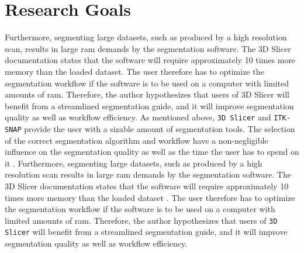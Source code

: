 \section{Research Goals}\label{s:introduction-researchgoals}
Furthermore, segmenting large datasets, such as produced by a high resolution \mct\space scan, results in large \acrfull{ram} demands by the segmentation software.
The 3D Slicer documentation states that the software will require approximately 10 times more memory than the loaded dataset.
The user therefore has to optimize the segmentation workflow if the software is to be used on a computer with limited amounts of \acrshort{ram}.
Therefore, the author hypothesizes that users of 3D Slicer will benefit from a streamlined segmentation guide, and it will improve segmentation quality as well as workflow efficiency.
As mentioned above, \texttt{3D Slicer} and \texttt{ITK-SNAP} provide the user with a sizable amount of segmentation tools. The selection of the correct segmentation algorithm and workflow have a non-negligible influence on the segmentation quality as well as the time the user has to spend on it \cite{liuSAMMSegmentAny2023}.
Furthermore, segmenting large datasets, such as produced by a high resolution \mct\space scan results in large \acrshort{ram} demands by the segmentation software\cite{smistadMedicalImageSegmentation2015}.
The 3D Slicer documentation states that the software will require approximately 10 times more memory than the loaded dataset \cite{slicercommunity3DSlicerImage2022,fedorov3DSlicerImage2012}.
The user therefore has to optimize the segmentation workflow if the software is to be used on a computer with limited amounts of \acrshort{ram}.
Therefore, the author hypothesizes that users of \texttt{3D Slicer} will benefit from a streamlined segmentation guide, and it will improve segmentation quality as well as workflow efficiency.

